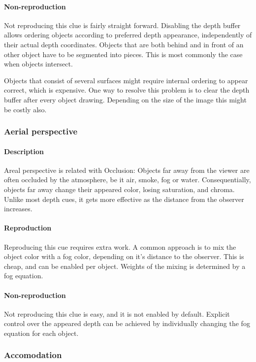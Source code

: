 \paragraph{Non-reproduction}
Not reproducing this clue is fairly straight forward. Disabling the depth buffer allows ordering objects according to preferred depth appearance, independently of their actual depth coordinates. Objects that are both behind and in front of an other object have to be segmented into pieces. This is most commonly the case when objects intersect.

Objects that consist of several surfaces might require internal ordering to appear correct, which is expensive. One way to resolve this problem is to clear the depth buffer after every object drawing. Depending on the size of the image this might be costly also.


\subsubsection{Aerial perspective}
\paragraph{Description}
Areal perspective is related with Occlusion: Objects far away from the viewer are often occluded by the atmosphere, be it air, smoke, fog or water. Consequentially, objects far away change their appeared color, losing saturation, and chroma.
Unlike most depth cues, it gets more effective as the distance from the observer increases.

\paragraph{Reproduction}
Reproducing this cue requires extra work. A common approach is to mix the object color with a fog color, depending on it's distance to the observer. This is cheap, and can be enabled per object\cite{fog}. Weights of the mixing is determined by a fog equation.

\paragraph{Non-reproduction}
Not reproducing this clue is easy, and it is not enabled by default. Explicit control over the appeared depth can be achieved by individually changing the fog equation for each object.


\subsubsection{Accomodation}

